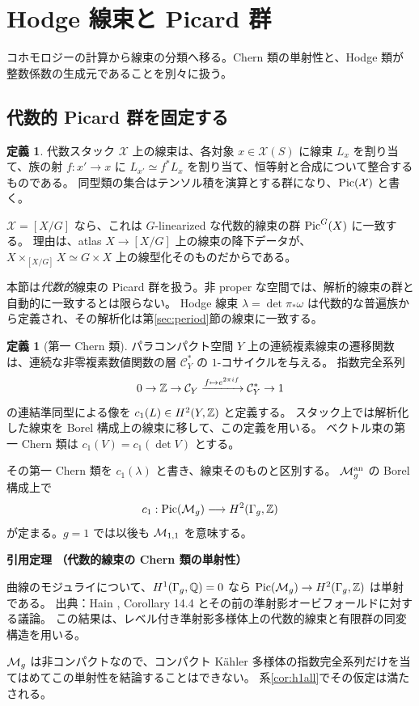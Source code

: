 \documentclass[dvipdfmx,a4paper,11pt]{article}
\theoremstyle{definition}
\newtheorem{dfn}[thm]{定義}
\newenvironment{aim}{\begin{tcolorbox}[mybox,colback=green!3,title=この章で考えること,fonttitle=\bfseries]}{\end{tcolorbox}}
\newenvironment{external}[1]{\Needspace{7\baselineskip}\refstepcounter{thm}\begin{tcolorbox}[mybox,colback=blue!2,colframe=blue!40!black]\textbf{引用定理 \thethm（#1）}\par}{\end{tcolorbox}}
\begin{document}
\section{Hodge 線束と Picard 群}\label{sec:pic}
\begin{aim}
コホモロジーの計算から線束の分類へ移る。Chern 類の単射性と、Hodge 類が整数係数の生成元であることを別々に扱う。
\end{aim}
\subsection{代数的 Picard 群を固定する}
\begin{dfn}
代数スタック $\mathcal X$ 上の線束は、各対象 $x\in\mathcal X(S)$ に線束 $L_x$ を割り当て、族の射 $f:x'\to x$ に $L_{x'}\simeq f^*L_x$ を割り当て、恒等射と合成について整合するものである。
同型類の集合はテンソル積を演算とする群になり、$\operatorname{Pic}(\mathcal X)$ と書く。
\end{dfn}
$\mathcal X=[X/G]$ なら、これは $G$-linearized な代数的線束の群 $\operatorname{Pic}^G(X)$ に一致する。
理由は、atlas $X\to[X/G]$ 上の線束の降下データが、$X\times_{[X/G]}X\simeq G\times X$ 上の線型化そのものだからである。

本節は\emph{代数的}線束の Picard 群を扱う。非 proper な空間では、解析的線束の群と自動的に一致するとは限らない。
Hodge 線束 $\lambda=\det\pi_*\omega$ は代数的な普遍族から定義され、その解析化は第\ref{sec:period}節の線束に一致する。
\begin{dfn}[第一 Chern 類]
パラコンパクト空間 $Y$ 上の連続複素線束の遷移関数は、連続な非零複素数値関数の層 $\mathcal C_Y^*$ の $1$-コサイクルを与える。
指数完全系列
\[
0\to\mathbb Z\to\mathcal C_Y\xrightarrow{f\mapsto e^{2\pi i f}}\mathcal C_Y^*\to1
\]
の連結準同型による像を $c_1(L)\in H^2(Y,\mathbb Z)$ と定義する。
スタック上では解析化した線束を Borel 構成上の線束に移して、この定義を用いる。
ベクトル束の第一 Chern 類は $c_1(V)=c_1(\det V)$ とする。
\end{dfn}
その第一 Chern 類を $c_1(\lambda)$ と書き、線束そのものと区別する。
$\mathcal M_g^{\rm an}$ の Borel 構成上で
\[
c_1:\operatorname{Pic}(\mathcal M_g)\longrightarrow H^2(\Gamma_g,\mathbb Z)
\]
が定まる。$g=1$ では以後も $\mathcal M_{1,1}$ を意味する。

\begin{external}{代数的線束の Chern 類の単射性}\label{input:chern}
曲線のモジュライについて、$H^1(\Gamma_g,\mathbb Q)=0$ なら
$\operatorname{Pic}(\mathcal M_g)\to H^2(\Gamma_g,\mathbb Z)$ は単射である。
出典：Hain \cite{Hain}, Corollary 14.4 とその前の準射影オービフォールドに対する議論。
この結果は、レベル付き準射影多様体上の代数的線束と有限群の同変構造を用いる。
\end{external}
$\mathcal M_g$ は非コンパクトなので、コンパクト Kähler 多様体の指数完全系列だけを当てはめてこの単射性を結論することはできない。
系\ref{cor:h1all}でその仮定は満たされる。
\end{document}
